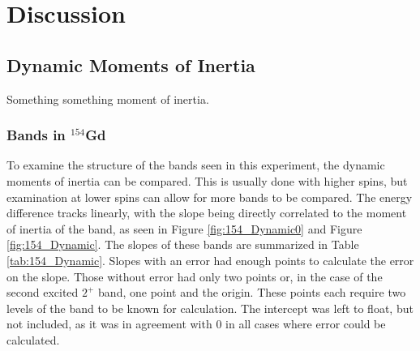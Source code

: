 %
%
%
%
%
%
%
%
%
%


%
%

\chapter{Discussion}

\section{Dynamic Moments of Inertia}
\label{sec:Dynamic}

Something something moment of inertia.

\subsection{Bands in $^{154}$Gd}
\label{sec:154_Dynamic}

To examine the structure of the bands seen in this experiment, the dynamic moments of inertia can be compared. This is usually done with higher spins, but examination at lower spins can allow for more bands to be compared. The energy difference tracks linearly, with the slope being directly correlated to the moment of inertia of the band, as seen in Figure \ref{fig:154_Dynamic0} and Figure \ref{fig:154_Dynamic}. The slopes of these bands are summarized in Table \ref{tab:154_Dynamic}. Slopes with an error had enough points to calculate the error on the slope. Those without error had only two points or, in the case of the second excited $2^+$ band, one point and the origin. These points each require two levels of the band to be known for calculation. The intercept was left to float, but not included, as it was in agreement with 0 in all cases where error could be calculated.

